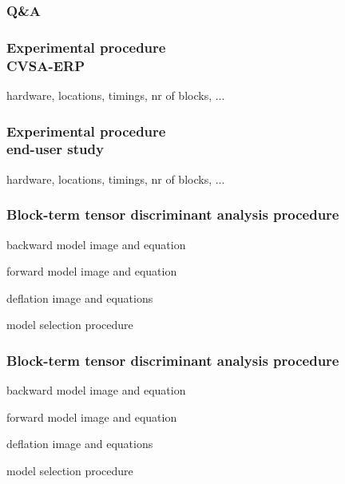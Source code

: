 \documentclass{kul-ulille-beamer}
\begin{document}
\begin{frame}
  \frametitle{Q\&A}

  \centering
\end{frame}
%



\begin{frame}[noframenumbering]
  \frametitle{Experimental procedure \\ CVSA-ERP}
  hardware, locations, timings, nr of blocks, ...
\end{frame}
\begin{frame}
  \frametitle{Experimental procedure \\ end-user study}
  hardware, locations, timings, nr of blocks, ...
\end{frame}

\begin{frame}[noframenumbering]

  \frametitle{Block-term tensor discriminant analysis procedure}
  backward model image and equation

  forward model image and equation

  deflation image and equations

  model selection procedure
\end{frame}

\begin{frame}[noframenumbering]

  \frametitle{Block-term tensor discriminant analysis procedure}
  backward model image and equation

  forward model image and equation

  deflation image and equations

  model selection procedure
\end{frame}
\end{document}
